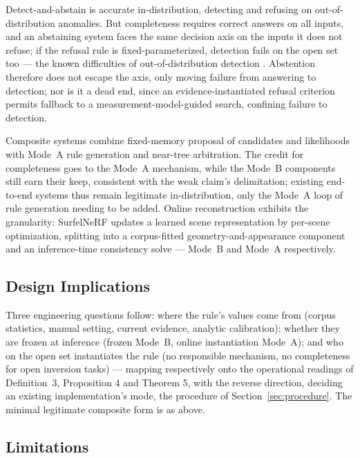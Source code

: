 Detect-and-abstain is accurate in-distribution, detecting and refusing on out-of-distribution anomalies. But completeness requires correct answers on all inputs, and an abstaining system faces the same decision axis on the inputs it does not refuse; if the refusal rule is fixed-parameterized, detection fails on the open set too --- the known difficulties of out-of-distribution detection \citep{hendrycks2016}. Abstention therefore does not escape the axis, only moving failure from answering to detection; nor is it a dead end, since an evidence-instantiated refusal criterion permits fallback to a measurement-model-guided search, confining failure to detection.

Composite systems combine fixed-memory proposal of candidates and likelihoods with Mode~A rule generation and near-tree arbitration. The credit for completeness goes to the Mode~A mechanism, while the Mode~B components still earn their keep, consistent with the weak claim's delimitation; existing end-to-end systems thus remain legitimate in-distribution, only the Mode~A loop of rule generation needing to be added. Online reconstruction exhibits the granularity: SurfelNeRF updates a learned scene representation by per-scene optimization, splitting into a corpus-fitted geometry-and-appearance component and an inference-time consistency solve \citep{gao2023surfelnerf} --- Mode~B and Mode~A respectively.

\subsection{Design Implications}

Three engineering questions follow: where the rule's values come from (corpus statistics, manual setting, current evidence, analytic calibration); whether they are frozen at inference (frozen Mode~B, online instantiation Mode~A); and who on the open set instantiates the rule (no responsible mechanism, no completeness for open inversion tasks) --- mapping respectively onto the operational readings of Definition~3, Proposition 4 and Theorem 5, with the reverse direction, deciding an existing implementation's mode, the procedure of Section~\ref{sec:procedure}. The minimal legitimate composite form is as above.

\subsection{Limitations}

